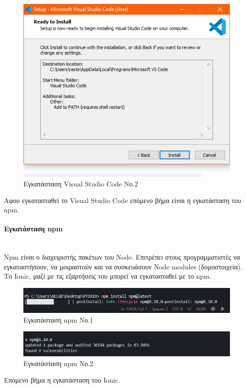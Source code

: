 \documentclass[a4paper,12pt]{article}
\newcommand{\myparagraph}[1]{\paragraph{#1}\mbox{}\\}
\begin{document}
				\begin{figure}[!htb]
					\begin{center}
						\caption{Εγκατάσταση Visual Studio Code Νο.2}
						\vspace*{0.5cm}
						\includegraphics[width=0.9\linewidth]{vsc} 
					\end{center}
				\end{figure}

				\newpage
				Αφου εγκατασταθεί το Visual Studio Code επόμενο βήμα είναι η εγκατάσταση του npm.
				
				\myparagraph{Εγκατάσταση npm}
				Npm είναι ο διαχειριστής πακέτων του Node. Επιτρέπει στους προγραμματιστές να εγκαταστήσουν, να μοιραστούν και να συσκευάσουν Node modules (δομοστοιχεία).  
				Το Ionic, μαζί με τις εξαρτήσεις του μπορεί να εγκατασταθεί με το npm.
				
				\begin{figure}[!htb]
					\begin{center}
						\caption{Εγκατάσταση npm Νο.1}
						\vspace*{0.5cm}
						\includegraphics[width=\linewidth]{npm1} 
					\end{center}
				\end{figure}

				\begin{figure}[!htb]
					\begin{center}
						\caption{Εγκατάσταση npm Νο.2}
						\vspace*{0.5cm}
						\includegraphics[width=\linewidth]{npm2} 
					\end{center}
				\end{figure}
				Επόμενο βήμα η εγκατάσταση του Ionic.
	
\end{document}
